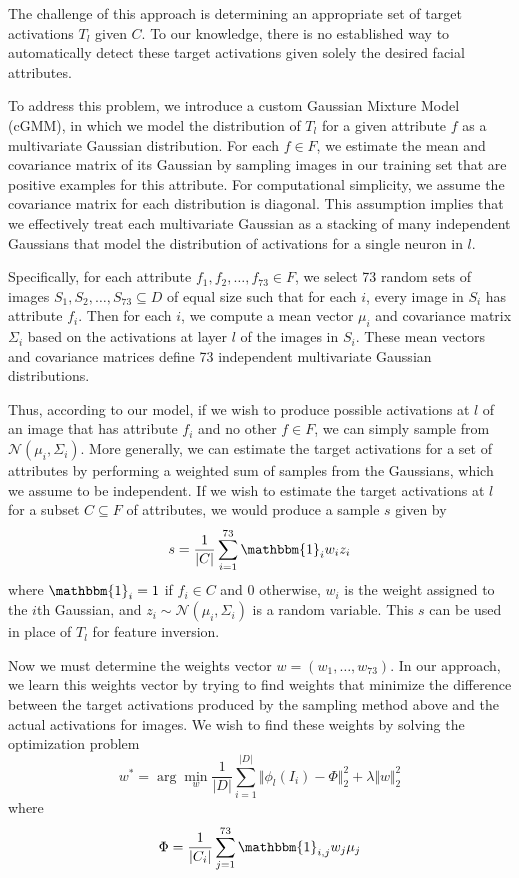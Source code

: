 \documentclass[10pt,twocolumn,letterpaper]{article}
\begin{document}
The challenge of this approach is determining an appropriate set of target activations $T_l$ given $C$.
To our knowledge, there is no established way to automatically detect these target activations given solely the desired facial attributes.

To address this problem, we introduce a custom Gaussian Mixture Model (cGMM), in which we model the distribution of $T_l$ for a given attribute $f$ as a multivariate Gaussian distribution.
For each $f\in F$, we estimate the mean and covariance matrix of its Gaussian by sampling images in our training set that are positive examples for this attribute.
For computational simplicity, we assume the covariance matrix for each distribution is diagonal.
This assumption implies that we effectively treat each multivariate Gaussian as a stacking of many independent Gaussians that model the distribution of activations for a single neuron in $l$.

Specifically, for each attribute $f_1, f_2, \ldots, f_{73}\in F$, we select 73 random sets of images $S_1,S_2, \ldots, S_{73}\subseteq D$ of equal size such that for each $i$, every image in $S_i$ has attribute $f_i$.
Then for each $i$, we compute a mean vector $\mu_i$ and covariance matrix $\Sigma_i$ based on the activations at layer $l$ of the images in $S_i$.
These mean vectors and covariance matrices define 73 independent multivariate Gaussian distributions.

Thus, according to our model, if we wish to produce possible activations at $l$ of an image that has attribute $f_i$ and no other $f\in F$, we can simply sample from $\mathcal{N}(\mu_i, \Sigma_i)$.
More generally, we can estimate the target activations for a set of attributes by performing a weighted sum of samples from the Gaussians, which we assume to be independent. 
If we wish to estimate the target activations at $l$ for a subset $C\subseteq F$ of attributes, we would produce a sample $s$ given by
\begin{equation}
    s = \frac{1}{|C|}\sum_{i=1}^{73} \mathbbm{1}_i w_i z_i
\end{equation}
where $\mathbbm{1}_i=1$ if $f_i\in C$ and 0 otherwise, $w_i$ is the weight assigned to the $i$th Gaussian, and $z_i\sim \mathcal{N}(\mu_i, \Sigma_i)$ is a random variable.
This $s$ can be used in place of $T_l$ for feature inversion.

Now we must determine the weights vector $w = (w_1, \ldots, w_{73})$.
In our approach, we learn this weights vector by trying to find weights that minimize the difference between the target activations produced by the sampling method above and the actual activations for images.
We wish to find these weights by solving the optimization problem
\begin{equation}
    w^* = \arg \min_w \frac{1}{|D|}\sum_{i=1}^{|D|} \Vert \phi_l(I_i) - \Phi \Vert_2^2 + \lambda\Vert w \Vert_2^2
\end{equation}
where
\begin{equation}
    \Phi = \frac{1}{|C_i|}\sum_{j=1}^{73} \mathbbm{1}_{i,j} w_j \mu_j
\end{equation}
\end{document}
